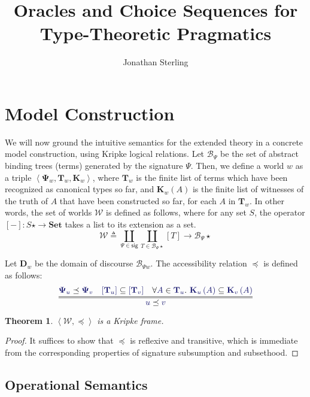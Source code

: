 \documentclass[11pt]{amsart}
\newtheorem{thm}{Theorem}[section]
\theoremstyle{definition}
\theoremstyle{remark}
\numberwithin{equation}{section}
\def\InputModeColorName{MidnightBlue}
\newcommand\IMode[1]{{\color{\InputModeColorName}{#1}}}
\newcommand\Sig[1]{\mathbf{\Psi}_{#1}}
\newcommand\PrecEq[2]{\IMode{#1}\preceq\IMode{#2}}
\newcommand\Pair[2]{\left\langle #1, #2 \right\rangle}
\newcommand\Member[2]{\IMode{#1} \in \IMode{#2}}
\newcommand\Worlds{\mathcal{W}}
\newcommand\MkWorld[3]{\left\langle #1, #2, #3\right\rangle}
\newcommand\List[1]{#1\star}
\newcommand\SETS{\mathbf{Set}}
\newcommand\Ext[1]{\left[#1\right]}
\newcommand\Term[1]{\mathcal{B}_{#1}}
\newcommand\SubsetEq[2]{\IMode{#1}\subseteq\IMode{#2}}
\newcommand\Dom[1]{\mathbf{D}_{#1}}
\newcommand\Types[1]{\mathbf{T}_{#1}}
\newcommand\Witnesses[1]{\mathbf{K}_{#1}}
\newcommand\WitnessesOf[2]{\Witnesses{#1}\left(#2\right)}
\begin{document}
\title{Oracles and Choice Sequences for Type-Theoretic Pragmatics}

\author{Jonathan Sterling}
\address{}

\maketitle

\section{Model Construction}

We will now ground the intuitive semantics for the extended theory in a
concrete model construction, using Kripke logical relations.  Let $\Term\Psi$
be the set of abstract binding trees (terms) generated by the signature $\Psi$.
Then, we define a world $w$ as a triple
$\MkWorld{\Sig{w}}{\Types{w}}{\Witnesses{w}}$, where $\Types{w}$ is the finite
list of terms which have been recognized as canonical types so far, and
$\WitnessesOf{w}{A}$ is the finite list of witnesses of the truth of $A$ that
have been constructed so far, for each $A$ in $\Types{w}$. In other words, the
set of worlds $\Worlds$ is defined as follows, where for any set $S$, the
operator $\Ext{-} : \List{S}\to\SETS$ takes a list to its extension as a set.
\[
  \Worlds
    \triangleq
     \coprod_{\Psi\in \mathsf{sig}}
      \coprod_{T\in\List{\Term{\Psi}}}
       \Ext{T}\to\List{\Term\Psi}
\]

Let $\Dom{w}$ be the domain of discourse $\Term{\Psi{w}}$. The accessibility
relation $\preceq$ is defined as follows:
\[
  \infer={
    \PrecEq{u}{v}
  }{
    \PrecEq{\Sig{u}}{\Sig{v}} &
    \SubsetEq{\Ext{\Types{u}}}{\Ext{\Types{v}}} &
    \forall\Member{A}{\Types{u}}.\ \SubsetEq{\WitnessesOf{u}{A}}{\WitnessesOf{v}{A}}
  }
\]

\begin{thm}
  $\Pair{\Worlds}{\preceq}$ is a Kripke frame.
\end{thm}
\begin{proof}
  It suffices to show that $\preceq$ is reflexive and transitive, which is immediate from the corresponding properties of signature subsumption and subsethood.
\end{proof}

\subsection{Operational Semantics}
\end{document}
